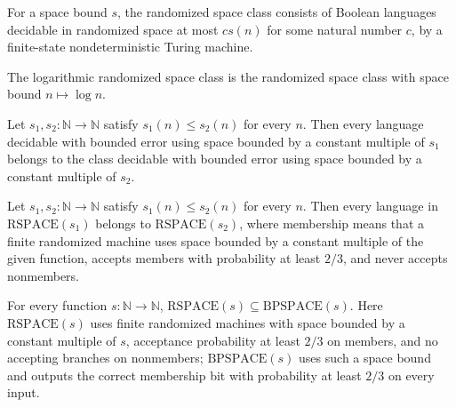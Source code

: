 \begin{definition}
\label{Randomized.RSPACE}
\leanok
{}
For a space bound $s$, the randomized space class consists of Boolean languages
decidable in randomized space at most $c s(n)$ for some natural number $c$, by a
finite-state nondeterministic Turing machine.
\end{definition}

\begin{definition}
\label{Randomized.RL}
\leanok
{}
The logarithmic randomized space class is the randomized space class with space bound
$n\mapsto \log n$.
\end{definition}

\begin{theorem}
\label{Randomized.BPSPACE.mono}
\leanok
{}
Let $s_1,s_2:\mathbb{N}\to\mathbb{N}$ satisfy $s_1(n)\le s_2(n)$ for every $n$. Then
every language decidable with bounded error using space bounded by a constant multiple
of $s_1$ belongs to the class decidable with bounded error using space bounded by a
constant multiple of $s_2$.
\end{theorem}

\begin{theorem}
\label{Randomized.RSPACE.mono}
\leanok
{}
Let $s_1,s_2 : \mathbb{N} \to \mathbb{N}$ satisfy $s_1(n) \le s_2(n)$ for every $n$.
Then every language in $\mathrm{RSPACE}(s_1)$ belongs to $\mathrm{RSPACE}(s_2)$, where
membership means that a finite randomized machine uses space bounded by a constant
multiple of the given function, accepts members with probability at least $2/3$, and
never accepts nonmembers.
\end{theorem}

\begin{theorem}
\label{Randomized.RSPACE_subset_BPSPACE}
\leanok
{}
For every function $s : \mathbb{N} \to \mathbb{N}$, $\mathrm{RSPACE}(s) \subseteq
\mathrm{BPSPACE}(s)$. Here $\mathrm{RSPACE}(s)$ uses finite randomized machines with
space bounded by a constant multiple of $s$, acceptance probability at least $2/3$ on
members, and no accepting branches on nonmembers; $\mathrm{BPSPACE}(s)$ uses such a
space bound and outputs the correct membership bit with probability at least $2/3$ on
every input.
\end{theorem}

